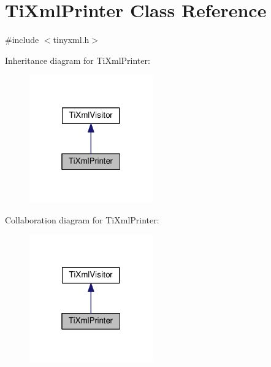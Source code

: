 \hypertarget{classTiXmlPrinter}{}\section{Ti\+Xml\+Printer Class Reference}
\label{classTiXmlPrinter}


{\ttfamily \#include $<$tinyxml.\+h$>$}



Inheritance diagram for Ti\+Xml\+Printer\+:\nopagebreak
\begin{figure}[H]
\begin{center}
\leavevmode
\includegraphics[width=151pt]{classTiXmlPrinter__inherit__graph}
\end{center}
\end{figure}


Collaboration diagram for Ti\+Xml\+Printer\+:\nopagebreak
\begin{figure}[H]
\begin{center}
\leavevmode
\includegraphics[width=151pt]{classTiXmlPrinter__coll__graph}
\end{center}
\end{figure}
